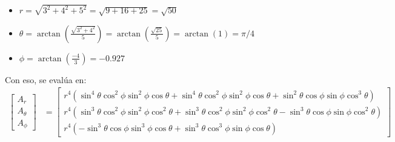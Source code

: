 \begin{problema}
\begin{enumerate}
\begin{sol}
\begin{itemize}
                \begin{itemize}
                    \item $r=\sqrt{3^2+4^2+5^2}=\sqrt{9+16+25}=\sqrt{50}$
                    \item $\theta=\arctan\left(\frac{\sqrt{3^2+4^2}}{5}\right)=\arctan\left(\frac{\sqrt{25}}{5}\right)=\arctan(1)=\pi/4$
                    \item $\phi=\arctan\left(\frac{-4}{3}\right)=-0.927$
                \end{itemize}
                Con eso, se evalúa en:
                \begin{align*}
                    \begin{bmatrix}
                        A_r\\
                        A_\theta\\
                        A_\phi
                    \end{bmatrix} 
                    &= \begin{bmatrix}
                        r^4\left(\sin^4\theta\cos^2\phi\sin^2\phi\cos\theta + \sin^4\theta\cos^2\phi\sin^2\phi\cos\theta+ \sin^2\theta\cos\phi\sin\phi\cos^3\theta\right)\\
                        r^4\left(\sin^3\theta\cos^2\phi\sin^2\phi\cos^2\theta + \sin^3\theta\cos^2\phi\sin^2\phi\cos^2\theta-\sin^3\theta\cos\phi\sin\phi\cos^2\theta\right)\\
                        r^4\left(-\sin^3\theta\cos\phi\sin^3\phi\cos\theta + \sin^3\theta\cos^3\phi\sin\phi\cos\theta\right)
                    \end{bmatrix}
                \end{align*}
            \end{itemize}
        \end{sol}
    \end{enumerate}
    
\end{problema}

